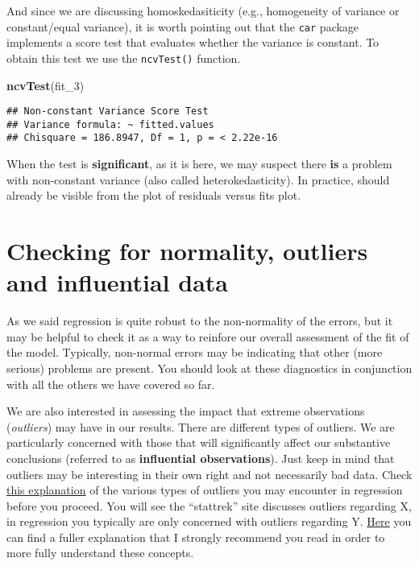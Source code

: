 \documentclass[
]{book}
\newenvironment{Shaded}{\begin{snugshade}}{\end{snugshade}}
\newcommand{\FunctionTok}[1]{\textcolor[rgb]{0.13,0.29,0.53}{\textbf{#1}}}
\newcommand{\NormalTok}[1]{#1}
\begin{document}
And since we are discussing homoskedasiticity (e.g., homogeneity of variance or constant/equal variance), it is worth pointing out that the \texttt{car} package implements a score test that evaluates whether the variance is constant. To obtain this test we use the \texttt{ncvTest()} function.

\begin{Shaded}
\begin{Highlighting}[]
\FunctionTok{ncvTest}\NormalTok{(fit\_3)}
\end{Highlighting}
\end{Shaded}

\begin{verbatim}
## Non-constant Variance Score Test 
## Variance formula: ~ fitted.values 
## Chisquare = 186.8947, Df = 1, p = < 2.22e-16
\end{verbatim}

When the test is \textbf{significant}, as it is here, we may suspect there \textbf{is} a problem with non-constant variance (also called heterokedasticity). In practice, should already be visible from the plot of residuals versus fits plot.

\section{Checking for normality, outliers and influential data}\label{checking-for-normality-outliers-and-influential-data}

As we said regression is quite robust to the non-normality of the errors, but it may be helpful to check it as a way to reinfore our overall assessment of the fit of the model. Typically, non-normal errors may be indicating that other (more serious) problems are present. You should look at these diagnostics in conjunction with all the others we have covered so far.

We are also interested in assessing the impact that extreme observations (\emph{outliers}) may have in our results. There are different types of outliers. We are particularly concerned with those that will significantly affect our substantive conclusions (referred to as \textbf{influential observations}). Just keep in mind that outliers may be interesting in their own right and not necessarily bad data. Check \href{http://stattrek.com/regression/influential-points.aspx}{this explanation} of the various types of outliers you may encounter in regression before you proceed. You will see the ``stattrek'' site discusses outliers regarding X, in regression you typically are only concerned with outliers regarding Y. \href{https://onlinecourses.science.psu.edu/stat501/node/337}{Here} you can find a fuller explanation that I strongly recommend you read in order to more fully understand these concepts.
\end{document}
